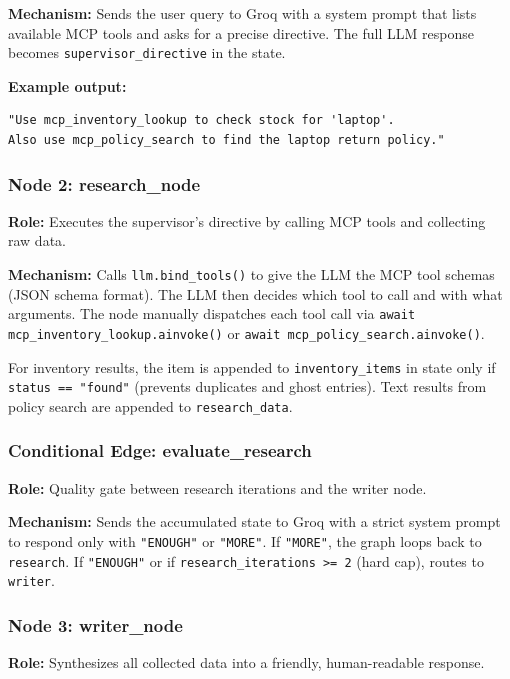 \documentclass[12pt]{article}
\begin{document}
\textbf{Mechanism:} Sends the user query to Groq with a system prompt that lists available MCP tools and asks for a precise directive. The full LLM response becomes \texttt{supervisor\_directive} in the state.

\textbf{Example output:}
\begin{lstlisting}
"Use mcp_inventory_lookup to check stock for 'laptop'.
Also use mcp_policy_search to find the laptop return policy."
\end{lstlisting}

\subsubsection{Node 2: research\_node}

\textbf{Role:} Executes the supervisor's directive by calling MCP tools and collecting raw data.

\textbf{Mechanism:} Calls \texttt{llm.bind\_tools()} to give the LLM the MCP tool schemas (JSON schema format). The LLM then decides which tool to call and with what arguments. The node manually dispatches each tool call via \texttt{await mcp\_inventory\_lookup.ainvoke()} or \texttt{await mcp\_policy\_search.ainvoke()}.

For inventory results, the item is appended to \texttt{inventory\_items} in state only if \texttt{status == "found"} (prevents duplicates and ghost entries). Text results from policy search are appended to \texttt{research\_data}.

\subsubsection{Conditional Edge: evaluate\_research}

\textbf{Role:} Quality gate between research iterations and the writer node.

\textbf{Mechanism:} Sends the accumulated state to Groq with a strict system prompt to respond only with \texttt{"ENOUGH"} or \texttt{"MORE"}. If \texttt{"MORE"}, the graph loops back to \texttt{research}. If \texttt{"ENOUGH"} or if \texttt{research\_iterations >= 2} (hard cap), routes to \texttt{writer}.

\subsubsection{Node 3: writer\_node}

\textbf{Role:} Synthesizes all collected data into a friendly, human-readable response.
\end{document}
